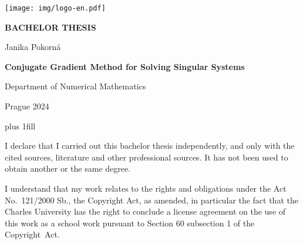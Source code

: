 

\pagestyle{empty}
\hypersetup{pageanchor=false}
\begin{center}

\centerline{\mbox{\texttt{[image: img/logo-en.pdf]}}}

\vspace{-8mm}
\vfill

{\bf\Large BACHELOR THESIS}

\vfill

{\LARGE{Janika Pokorná}}

\vspace{15mm}

{\LARGE\bfseries{Conjugate Gradient Method for Solving Singular Systems}}

\vfill

Department of Numerical Mathematics

\vfill

{
\centerline{\vbox{}}}

\vfill

Prague 2024

\end{center}

\newpage



\openright
\hypersetup{pageanchor=true}
\pagestyle{plain}
\vglue 0pt plus 1fill

\noindent
I declare that I carried out this bachelor thesis independently, and only with the cited
sources, literature and other professional sources. It has not been used to obtain another
or the same degree.

\medskip\noindent
I understand that my work relates to the rights and obligations under the Act No.~121/2000 Sb.,
the Copyright Act, as amended, in particular the fact that the Charles
University has the right to conclude a license agreement on the use of this
work as a school work pursuant to Section 60 subsection 1 of the Copyright~Act.

